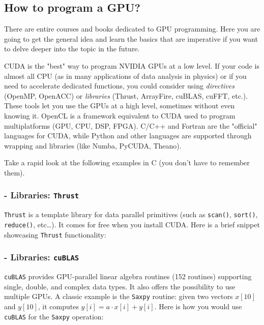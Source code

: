 \subsection{How to program a GPU?}

There are entire courses and books dedicated to GPU programming. Here you are going to get the general idea and learn the basics that are imperative if you want to delve deeper into the topic in the future.

CUDA is the "best" way to program NVIDIA GPUs at a low level. If your code is almost all CPU (as in many applications of data analysis in physics) or if you need to accelerate dedicated functions, you could consider using \textit{directives} (OpenMP, OpenACC) or \textit{libraries} (Thrust, ArrayFire, cuBLAS, cuFFT, etc.). These tools let you use the GPUs at a high level, sometimes without even knowing it. OpenCL is a framework equivalent to CUDA used to program multiplatforms (GPU, CPU, DSP, FPGA). C/C++ and Fortran are the "official" languages for CUDA, while Python and other languages are supported through wrapping and libraries (like Numba, PyCUDA, Theano).

Take a rapid look at the following examples in C (you don't have to remember them).

\subsubsection{- Libraries: \texttt{Thrust}}

\texttt{Thrust} is a template library for data parallel primitives (such as \texttt{scan()}, \texttt{sort()}, \texttt{reduce()}, etc\dots). It comes for free when you install CUDA. Here is a brief snippet showcasing \texttt{Thrust} functionality:



\subsubsection{- Libraries: \texttt{cuBLAS}}

\texttt{cuBLAS} provides GPU-parallel linear algebra routines (152 routines) supporting single, double, and complex data types. It also offers the possibility to use multiple GPUs. A classic example is the \texttt{Saxpy} routine: given two vectors $x[10]$ and $y[10]$, it computes $y[i] = a \cdot x[i] + y[i]$. Here is how you would use \texttt{cuBLAS} for the \texttt{Saxpy} operation:



